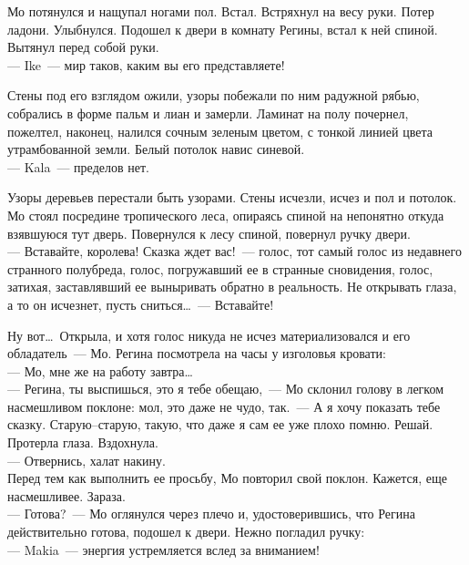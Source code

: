Мо потянулся и нащупал ногами пол. Встал. Встряхнул на весу руки. Потер ладони. 
Улыбнулся. Подошел к двери в комнату Регины, встал к ней спиной. Вытянул перед 
собой руки.\\
--- Ike~--- мир таков, каким вы его представляете!

Стены под его взглядом ожили, узоры побежали по ним радужной рябью, собрались в 
форме пальм и лиан и замерли. Ламинат на полу почернел, пожелтел, наконец, 
налился сочным зеленым цветом, с тонкой линией цвета утрамбованной земли. Белый 
потолок навис синевой.\\
--- Kala~--- пределов нет.


Узоры деревьев перестали быть узорами. Стены исчезли, исчез и пол и потолок. Мо 
стоял посредине тропического леса, опираясь спиной на непонятно откуда 
взявшуюся тут дверь. Повернулся к лесу спиной, повернул ручку двери.\\
--- Вставайте, королева! Сказка ждет вас!~--- голос, тот самый голос из недавнего 
странного полубреда, голос, погружавший ее в странные сновидения, голос, 
затихая, заставлявший ее выныривать обратно в реальность. Не открывать глаза, а 
то он исчезнет, пусть сниться\ldots~--- Вставайте!

Ну вот\ldots\ Открыла, и хотя голос никуда не исчез материализовался и его 
обладатель~--- Мо. Регина посмотрела на часы у изголовья кровати:\\
--- Мо, мне же на работу завтра\ldots\\
--- Регина, ты выспишься, это я тебе обещаю,~--- Мо склонил голову в легком 
насмешливом поклоне: мол, это даже не чудо, так.~--- А я хочу показать тебе 
сказку. Старую--старую, такую, что даже я сам ее уже плохо помню. Решай.\\
Протерла глаза. Вздохнула.\\
--- Отвернись, халат накину.\\
Перед тем как выполнить ее просьбу, Мо повторил свой поклон. Кажется, еще 
насмешливее. Зараза.\\
--- Готова?~--- Мо оглянулся через плечо и, удостоверившись, что Регина 
действительно готова, подошел к двери. Нежно погладил ручку:\\
--- Makia~--- энергия устремляется вслед за вниманием!

\newpage

